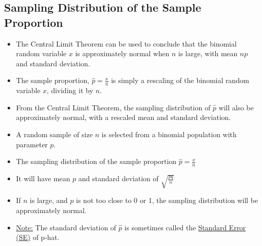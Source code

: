 \documentclass[12pt, letterpaper]{article}
\begin{document}
        \subsection{Sampling Distribution of the Sample Proportion}
            \begin{itemize}
                \item The Central Limit Theorem can be used to conclude that the binomial random variable $x$ is approximately normal when $n$ is large, with mean $np$ and standard deviation.
                \item The sample proportion, $\hat{p} = \frac{x}{n}$ is simply a rescaling of the binomial random variable $x$, dividing it by $n$.
                \item From the Central Limit Theorem, the sampling distribution of $\hat{p}$ will also be approximately normal, with a rescaled mean and standard deviation.
            \end{itemize}
            \begin{mdframed}[leftmargin=10pt, rightmargin=10pt]
                \begin{itemize}
                    \item A random sample of size $n$ is selected from a binomial population with parameter $p$.
                    \item The sampling distribution of the sample proportion $\hat{p} = \frac{x}{n}$
                    \item It will have mean $p$ and standard deviation of $\sqrt{\frac{pq}{n}}$
                    \item If $n$ is large, and $p$ is not too close to 0 or 1, the sampling distribution will be approximately normal.
                    \item \underline{Note:} The standard deviation of $\hat{p}$ is sometimes called the \underline{Standard Error (SE)} of p-hat.
                \end{itemize}
            \end{mdframed}
\end{document}
